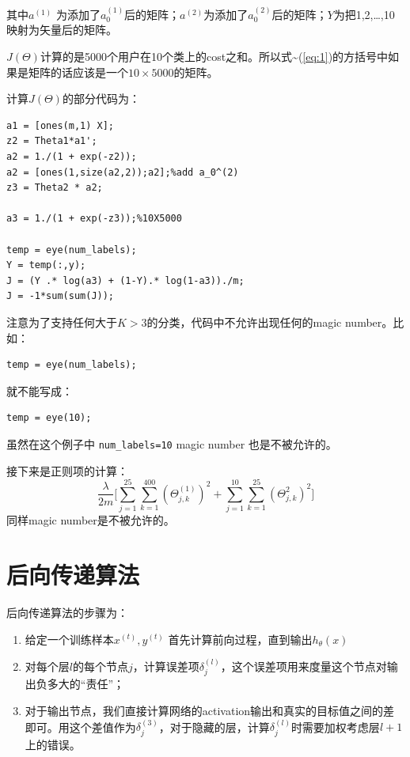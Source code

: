 \documentclass[10pt,a4paper,UTF8]{article}
\begin{document}
其中\(a^{(1)}\) 为添加了\(a_{0}^{(1)}\)后的矩阵；\(a^{(2)}\)为添加了\(a_{0}^{(2)}\)后的矩阵；\(Y\)为把1,2,\ldots{},10映射为矢量后的矩阵。


\(J(\Theta)\)计算的是5000个用户在10个类上的cost之和。所以式\textasciitilde{}(\ref{eq:1})的方括号中如果是矩阵的话应该是一个\(10\times 5000\)的矩阵。

计算\(J(\Theta)\)的部分代码为：
\lstset{language=matlab,label= ,caption= ,captionpos=b,numbers=none}
\begin{lstlisting}
a1 = [ones(m,1) X];
z2 = Theta1*a1';
a2 = 1./(1 + exp(-z2));
a2 = [ones(1,size(a2,2));a2];%add a_0^(2)
z3 = Theta2 * a2;

a3 = 1./(1 + exp(-z3));%10X5000

temp = eye(num_labels);
Y = temp(:,y);
J = (Y .* log(a3) + (1-Y).* log(1-a3))./m;
J = -1*sum(sum(J));
\end{lstlisting}
注意为了支持任何大于\(K>3\)的分类，代码中不允许出现任何的magic number。比如：
\lstset{language=matlab,label= ,caption= ,captionpos=b,numbers=none}
\begin{lstlisting}
temp = eye(num_labels);
\end{lstlisting}
就不能写成：
\lstset{language=matlab,label= ,caption= ,captionpos=b,numbers=none}
\begin{lstlisting}
temp = eye(10);
\end{lstlisting}
虽然在这个例子中 \texttt{num\_labels=10} magic number 也是不被允许的。

接下来是正则项的计算：
\begin{equation}
\label{eq:2}
\frac{\lambda}{2m} \big [ \sum_{j=1}^{25}\sum_{k=1}^{400} (\Theta_{j,k}^{(1)})^{2} + \sum_{j=1}^{10}\sum_{k=1}^{25}(\Theta_{j,k}^{2})^{2} \big]
\end{equation}
同样magic number是不被允许的。
\section{后向传递算法}
\label{sec:orgb64c8c7}


后向传递算法的步骤为：
\begin{enumerate}
\item 给定一个训练样本\(x^{(t)},y^{(t)}\) 首先计算前向过程，直到输出\(h_{\theta}(x)\)
\item 对每个层\(l\)的每个节点\(j\)，计算误差项\(\delta_{j}^{(l)}\)，这个误差项用来度量这个节点对输出负多大的“责任”；
\item 对于输出节点，我们直接计算网络的activation输出和真实的目标值之间的差即可。用这个差值作为\(\delta_{j}^{(3)}\)，对于隐藏的层，计算\(\delta_{j}^{(l)}\)时需要加权考虑层\(l+1\)上的错误。
\end{enumerate}
\end{document}
